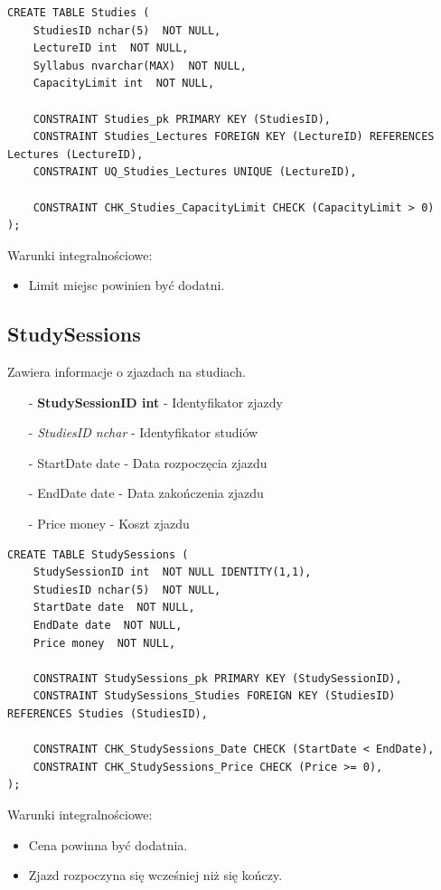 \documentclass[11pt,a4paper]{article}
\begin{document}
\begin{Verbatim}[breaklines=true]
CREATE TABLE Studies (
    StudiesID nchar(5)  NOT NULL,
    LectureID int  NOT NULL,
    Syllabus nvarchar(MAX)  NOT NULL,
    CapacityLimit int  NOT NULL,

    CONSTRAINT Studies_pk PRIMARY KEY (StudiesID),
    CONSTRAINT Studies_Lectures FOREIGN KEY (LectureID) REFERENCES Lectures (LectureID),
    CONSTRAINT UQ_Studies_Lectures UNIQUE (LectureID),
    
    CONSTRAINT CHK_Studies_CapacityLimit CHECK (CapacityLimit > 0)
);
\end{Verbatim}

Warunki integralnościowe:
\begin{itemize}
    \item Limit miejsc powinien być dodatni.
\end{itemize}

\subsection{StudySessions}
Zawiera informacje o zjazdach na studiach.

\begin{itemize}
    \item[-] \textbf{StudySessionID int} - Identyfikator zjazdy
    \item[-] \textit{StudiesID nchar} - Identyfikator studiów
    \item[-] StartDate date - Data rozpoczęcia zjazdu
    \item[-] EndDate date - Data zakończenia zjazdu
    \item[-] Price money - Koszt zjazdu
\end{itemize}

\begin{Verbatim}[breaklines=true]
CREATE TABLE StudySessions (
    StudySessionID int  NOT NULL IDENTITY(1,1),
    StudiesID nchar(5)  NOT NULL,
    StartDate date  NOT NULL,
    EndDate date  NOT NULL,
    Price money  NOT NULL,

    CONSTRAINT StudySessions_pk PRIMARY KEY (StudySessionID),
    CONSTRAINT StudySessions_Studies FOREIGN KEY (StudiesID) REFERENCES Studies (StudiesID),

    CONSTRAINT CHK_StudySessions_Date CHECK (StartDate < EndDate),
    CONSTRAINT CHK_StudySessions_Price CHECK (Price >= 0),
);
\end{Verbatim}

Warunki integralnościowe:
\begin{itemize}
    \item Cena powinna być dodatnia.
    \item Zjazd rozpoczyna się wcześniej niż się kończy.
\end{itemize}
\end{document}
